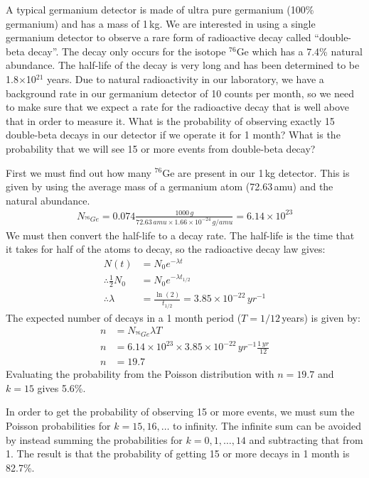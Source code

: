 \begin{example}{}{A typical germanium detector is made of ultra pure germanium (100\% germanium) and has a mass of 1\,kg. We are interested in using a single germanium detector to observe a rare form of radioactive decay called ``double-beta decay''. The decay only occurs for the isotope $^{76}$Ge which has a 7.4\% natural abundance. The half-life of the decay is very long and has been determined to be 1.8$\times$10$^{21}$ years. Due to natural radioactivity in our laboratory, we have a background rate in our germanium detector of 10 counts per month, so we need to make sure that we expect a rate for the radioactive decay that is well above that in order to measure it. What is the probability of observing exactly 15 double-beta decays in our detector if we operate it for 1 month? What is the probability that we will see 15 or more events from double-beta decay?}{}

First we must find out how many $^{76}$Ge are present in our 1\,kg detector. This is given by using the average mass of a germanium atom (72.63\,amu) and the natural abundance. 
\begin{align*}
N_{^{76}Ge}=0.074\frac{1000\,g}{72.63\,amu\times1.66\times10^{-24}\,g/amu}=6.14\times10^{23}
\end{align*}
We must then convert the half-life to a decay rate. The half-life is the time that it takes for half of the atoms to decay, so the radioactive decay law gives:
\begin{align*}
N(t)&=N_0e^{-\lambda t}\\
\therefore \frac{1}{2}N_0&=N_0e^{-\lambda t_{1/2}}\\
\therefore \lambda&=\frac{\ln(2)}{t_{1/2}}=3.85\times 10^{-22}\,yr^{-1}
\end{align*}
The expected number of decays in a 1 month period ($T=1/12$\,years) is given by:
\begin{align*}
n&=N_{^{76}Ge}\lambda T\\
n&=6.14\times10^{23}\times3.85\times 10^{-22}\,yr^{-1}\frac{1\,yr}{12}\\
n&=19.7
\end{align*}
Evaluating the probability from the Poisson distribution with $n=19.7$ and $k=15$ gives 5.6\%.

In order to get the probability of observing 15 or more events, we must sum the Poisson probabilities for $k=15,16,\dots$ to infinity. The infinite sum can be avoided by instead summing the probabilities for $k=0,1,\dots,14$ and subtracting that from 1. The result is that the probability of getting 15 or more decays in 1 month is 82.7\%.


\end{example}

